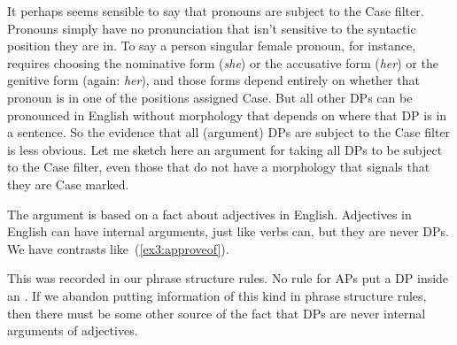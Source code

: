 It perhaps seems sensible to say that pronouns are subject to the Case filter. Pronouns simply have no pronunciation that isn't sensitive to the syntactic position they are in. To say a  person singular female pronoun, for instance, requires choosing the nominative form (\emph{she}) or the accusative form (\emph{her}) or the genitive form (again: \emph{her}), and those forms depend entirely on whether that pronoun is in one of the positions assigned Case. But all other DPs can be pronounced in English without morphology that depends on where that DP is in a sentence. So the evidence that all (argument) DPs are subject to the Case filter is less obvious. Let me sketch here an argument for taking all DPs to be subject to the Case filter, even those that do not have a morphology that signals that they are Case marked.

The argument is based on a fact about adjectives in English. Adjectives in English can have internal arguments, just like verbs can, but they are never DPs. We have contrasts like~(\ref{ex3:approveof}).
\begin{exe}
	\raggedright
	\ex \label{ex3:approveof} 
	\begin{xlist}
	\end{xlist}
\end{exe}
This was recorded in our phrase structure rules. No rule for APs put a DP inside an . If we abandon putting information of this kind in phrase structure rules, then there must be some other source of the fact that DPs are never internal arguments of adjectives.

